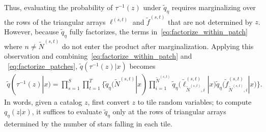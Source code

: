 Thus, evaluating the probability of $\tau^{-1}(z)$ under $\tilde q_\eta$ requires marginalizing over the rows of the triangular arrays $\ell^{(s, t)}$ and $\tilde f^{(s, t)}$ that are not determined by $z$. However, 
because $\tilde q_\eta$ fully factorizes, the terms 
in~\eqref{eq:factorize_within_patch} where $n \not= \tilde N^{(s,t)}$ do not enter the
product
after marginalization.
Applying this observation and combining~\eqref{eq:factorize_within_patch} and ~\eqref{eq:factorize_patches}, $\tilde q(\tau^{-1}(z) | x)$ becomes
\begin{align}
    \tilde q(\tau^{-1}(z) | x) = \prod_{s=1}^S\prod_{t=1}^T
    \Big\{
    \tilde q_\eta(\tilde N^{(s,t)} | x) 
    \prod_{i = 1}^{\tilde N^{(s,t)}}
    \tilde q_\eta\big(\tilde \ell_{\tilde N^{(s,t)},i}^{(s, t)} | x\big)
    \tilde q_\eta\big(\tilde f_{\tilde N^{(s,t)},i}^{(s, t)} | x\big)
    \Big\}.
\end{align}
In words, given a catalog $z$,
first convert $z$ to tile random variables;
to compute $q_\eta(z | x)$, it suffices to evaluate $\tilde q_\eta$ only at the rows of triangular 
arrays determined by the number 
of stars falling in each tile. 





